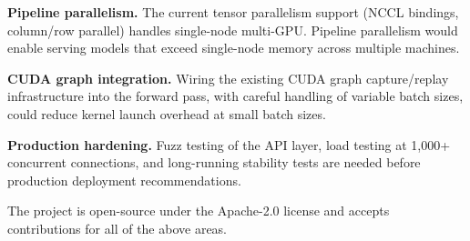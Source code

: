 \documentclass[11pt,a4paper]{article}
\begin{document}
\textbf{Pipeline parallelism.} The current tensor parallelism support (NCCL bindings,
column/row parallel) handles single-node multi-GPU. Pipeline parallelism would enable
serving models that exceed single-node memory across multiple machines.

\textbf{CUDA graph integration.} Wiring the existing CUDA graph capture/replay
infrastructure into the forward pass, with careful handling of variable batch sizes,
could reduce kernel launch overhead at small batch sizes.

\textbf{Production hardening.} Fuzz testing of the API layer, load testing at 1,000+
concurrent connections, and long-running stability tests are needed before production
deployment recommendations.

The project is open-source under the Apache-2.0 license and accepts contributions for
all of the above areas.



\end{document}
